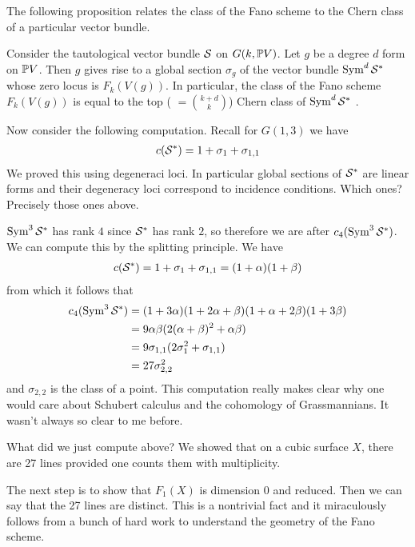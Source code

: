 \documentclass[12pt]{article}
\begin{document}
The following proposition relates the class 
of the Fano scheme to the Chern class of a particular vector bundle.

\begin{proposition}
    Consider the tautological vector bundle $\cS$ on $G(k,\P V)$. Let $g$
    be a degree $d$ form on $\P V$. Then $g$ gives rise to a global section $\sigma_g$ of 
    the vector bundle $\Sym^d \cS^*$ whose zero locus is $F_k(V(g))$. In particular,
    the class of the Fano scheme $F_k(V(g))$ is equal to the top ( $= \binom{k+d}{k}$) Chern class
    of $\Sym^d \cS^*$ .
\end{proposition}

Now consider the following computation. Recall for $G(1,3)$ we have \begin{align*}
    c(\cS^*) = 1 + \sigma_1 + \sigma_{1,1}
\end{align*} We proved this using degeneraci loci. In particular global sections of
$\cS^*$ are linear forms and their degeneracy loci correspond to incidence conditions. 
Which ones? Precisely those ones above.

\hfill

$\Sym^3\cS^*$ has rank $4$ since $\cS^*$ has rank $2$, so therefore we are after 
$c_4(\Sym^3\cS^*)$. We can compute this by the splitting principle. We have \begin{align*}
    c(\cS^*) = 1 + \sigma_1 + \sigma_{1,1} = (1+\alpha)(1+\beta)
\end{align*} from which it follows that \begin{align*}
    c_4(\Sym^3\cS^*) &= (1+3\alpha)(1 + 2\alpha + \beta)(1 + \alpha + 2\beta)(1 + 3\beta) \\
    &= 9\alpha\beta(2(\alpha + \beta)^2 + \alpha\beta) \\
    &= 9\sigma_{1,1}(2\sigma_1^2 + \sigma_{1,1}) \\
    &= 27 \sigma_{2,2}^2 
\end{align*} and $\sigma_{2,2}$ is the class of a point.
This computation really makes clear why one would care about Schubert calculus 
and the cohomology of Grassmannians. It wasn't always so clear to me before.

\begin{remark}
    What did we just compute above? We showed that on a cubic surface $X$, 
    there are 27 lines provided one counts them with multiplicity.
\end{remark}
The next step is to show that $F_1(X)$ is dimension $0$ and reduced. Then 
we can say that the 27 lines are distinct. This is a nontrivial fact and it miraculously
follows from a bunch of hard work to understand the geometry of the Fano scheme.
\end{document}
